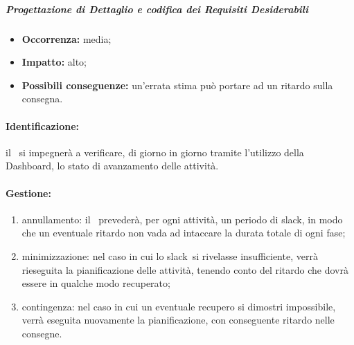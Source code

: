 \documentclass[../PianoProgetto.tex]{subfiles}
\begin{document}
		\subparagraph*{Progettazione di Dettaglio e codifica dei Requisiti Desiderabili}
			\begin{itemize}[label={-}]
				\item \textbf{Occorrenza:} media;
				\item \textbf{Impatto:} alto;
				\item \textbf{Possibili conseguenze:} un'errata stima può portare ad un ritardo sulla consegna.
			\end{itemize}
			
	
	\paragraph*{Identificazione:} il \responsabilediprogetto\ si impegnerà a verificare, di giorno in giorno tramite l'utilizzo della Dashboard\g, lo stato di avanzamento delle attività.
	
	\paragraph*{Gestione:}
	\begin{enumerate}
		\item annullamento: il \responsabilediprogetto\ prevederà, per ogni attività, un periodo di slack\g, in modo che un eventuale ritardo non vada ad intaccare la durata totale di ogni fase\g ;
		\item minimizzazione: nel caso in cui lo slack\g\ si rivelasse insufficiente, verrà rieseguita la pianificazione delle attività, tenendo conto del ritardo che dovrà essere in qualche modo recuperato;
		\item contingenza: nel caso in cui un eventuale recupero si dimostri impossibile, verrà eseguita nuovamente la pianificazione, con conseguente ritardo nelle consegne.
	\end{enumerate}	
	
	
\end{document}
